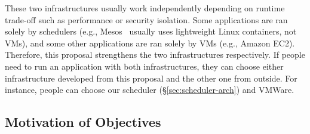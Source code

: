 These two infrastructures usually work independently depending on 
runtime trade-off such as performance or security isolation. Some applications 
are ran solely by schedulers (e.g., Mesos~\cite{mesos:nsdi11} usually uses 
lightweight Linux containers, not VMs), and some other applications are ran 
solely by VMs (e.g., Amazon EC2). Therefore, this proposal strengthens the 
two infrastructures respectively. If people need to run an application with 
both infrastructures, they can choose either infrastructure developed from 
this proposal and the other one from outside. For instance, people can choose 
our \tripod scheduler (\S\ref{sec:scheduler-arch}) and VMWare.





% 




\vspace{-.15in}\subsection{Motivation of Objectives} 
\label{sec:motivation}\vspace{-.075in}

